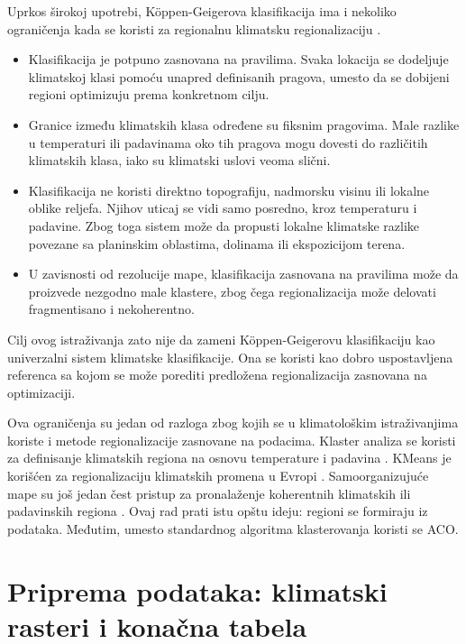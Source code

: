 \documentclass[11pt]{article}
\begin{document}
Uprkos širokoj upotrebi, Köppen-Geigerova klasifikacija ima i nekoliko ograničenja kada se koristi za regionalnu klimatsku regionalizaciju \cite{fovell1993,swenson2019}.
\begin{itemize}
  \item Klasifikacija je potpuno zasnovana na pravilima. Svaka lokacija se dodeljuje klimatskoj klasi pomoću unapred definisanih pragova, umesto da se dobijeni regioni optimizuju prema konkretnom cilju.
  \item Granice između klimatskih klasa određene su fiksnim pragovima. Male razlike u temperaturi ili padavinama oko tih pragova mogu dovesti do različitih klimatskih klasa, iako su klimatski uslovi veoma slični.
  \item Klasifikacija ne koristi direktno topografiju, nadmorsku visinu ili lokalne oblike reljefa. Njihov uticaj se vidi samo posredno, kroz temperaturu i padavine. Zbog toga sistem može da propusti lokalne klimatske razlike povezane sa planinskim oblastima, dolinama ili ekspozicijom terena.
  \item U zavisnosti od rezolucije mape, klasifikacija zasnovana na pravilima može da proizvede nezgodno male klastere, zbog čega regionalizacija može delovati fragmentisano i nekoherentno.
\end{itemize}

Cilj ovog istraživanja zato nije da zameni Köppen-Geigerovu klasifikaciju kao univerzalni sistem klimatske klasifikacije. Ona se koristi kao dobro uspostavljena referenca sa kojom se može porediti predložena regionalizacija zasnovana na optimizaciji.

Ova ograničenja su jedan od razloga zbog kojih se u klimatološkim istraživanjima koriste i metode regionalizacije zasnovane na podacima. Klaster analiza se koristi za definisanje klimatskih regiona na osnovu temperature i padavina \cite{fovell1993}. KMeans je korišćen za regionalizaciju klimatskih promena u Evropi \cite{carvalho2016}. Samoorganizujuće mape su još jedan čest pristup za pronalaženje koherentnih klimatskih ili padavinskih regiona \cite{sheridan2011,swenson2019}. Ovaj rad prati istu opštu ideju: regioni se formiraju iz podataka. Međutim, umesto standardnog algoritma klasterovanja koristi se ACO.

\section{Priprema podataka: klimatski rasteri i konačna tabela}
\label{sec:data-prep}
\end{document}
